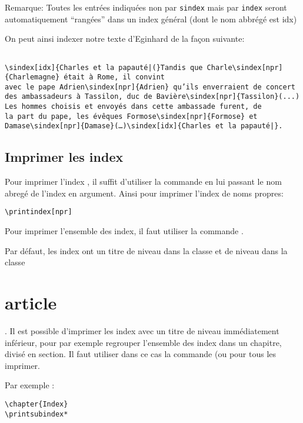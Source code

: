 Remarque: Toutes les entrées indiquées non par \verb|sindex| mais par \verb|index| seront automatiquement \enquote{rangées} dans un index général (dont le nom abbrégé est idx)

On peut ainsi indexer notre texte d'Eginhard de la façon suivante:

\begin{verbatim}

\sindex[idx]{Charles et la papauté|(}Tandis que Charle\sindex[npr]{Charlemagne} était à Rome, il convint
avec le pape Adrien\sindex[npr]{Adrien} qu’ils enverraient de concert
des ambassadeurs à Tassilon, duc de Bavière\sindex[npr]{Tassilon}(...)
Les hommes choisis et envoyés dans cette ambassade furent, de 
la part du pape, les évêques Formose\sindex[npr]{Formose} et 
Damase\sindex[npr]{Damase}(…)\sindex[idx]{Charles et la papauté|}.

\end{verbatim}


\subsection{Imprimer les index}

Pour imprimer l'index , il suffit d'utiliser la commande  en lui passant le nom abregé de l'index en argument. Ainsi pour imprimer l'index de noms propres:

\begin{verbatim}
\printindex[npr]
\end{verbatim}

Pour imprimer l'ensemble des index, il faut utiliser la commande .

Par défaut, les index ont un titre de niveau  dans la classe  et de niveau  dans la classe \section{article}. Il est possible d'imprimer les index avec un titre de niveau immédiatement inférieur, pour par exemple regrouper l'ensemble des index dans un chapitre, divisé en section. Il faut utiliser dans ce cas la commande  (ou  pour tous les imprimer.

Par exemple :

\begin{verbatim}
\chapter{Index}
\printsubindex*
\end{verbatim}



